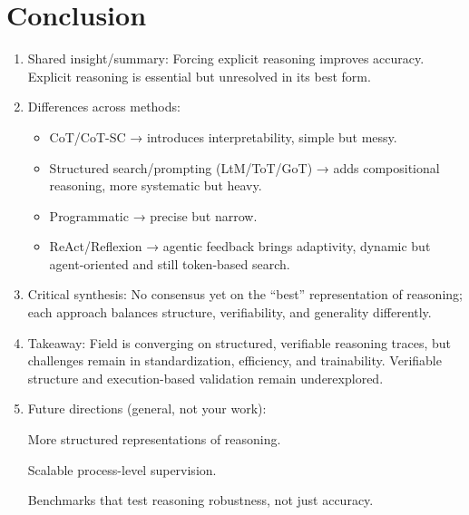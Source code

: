 \documentclass[project]{bsu-cs}  %
\begin{document}
\chapter{Conclusion}\label{ch:conclusion}
\begin{enumerate}
    \item Shared insight/summary: Forcing explicit reasoning improves accuracy. Explicit reasoning is essential but unresolved in its best form.

    \item Differences across methods:
    \begin{itemize}
        \item CoT/CoT-SC → introduces interpretability, simple but messy.

        \item Structured search/prompting (LtM/ToT/GoT) → adds compositional reasoning, more systematic but heavy.

        \item Programmatic → precise but narrow.

        \item ReAct/Reflexion → agentic feedback brings adaptivity, dynamic but agent-oriented and still token-based search.
    \end{itemize}

    \item Critical synthesis: No consensus yet on the “best” representation of reasoning; each approach balances structure, verifiability, and generality differently.

    \item Takeaway: Field is converging on structured, verifiable reasoning traces, but challenges remain in standardization, efficiency, and trainability. Verifiable structure and execution-based validation remain underexplored.

    \item Future directions (general, not your work):

        \subitem More structured representations of reasoning.

        \subitem Scalable process-level supervision.

        \subitem Benchmarks that test reasoning robustness, not just accuracy.
\end{enumerate}
\end{document}
